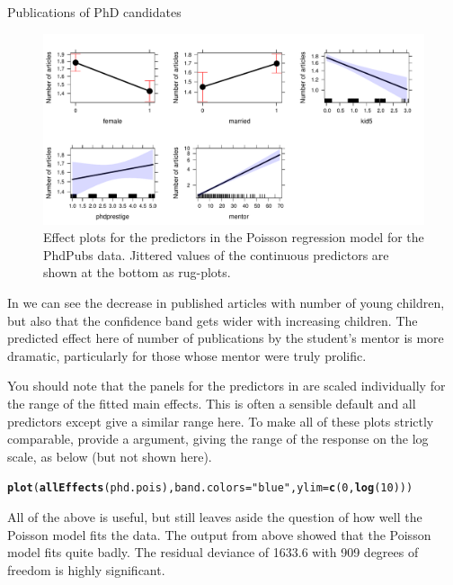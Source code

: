 \documentclass[11pt]{book}\usepackage[]{graphicx}\usepackage[]{color}
\makeatletter
\newcommand{\hlnum}[1]{\textcolor[rgb]{0.686,0.059,0.569}{#1}}%
\newcommand{\hlstr}[1]{\textcolor[rgb]{0.192,0.494,0.8}{#1}}%
\newcommand{\hlstd}[1]{\textcolor[rgb]{0.345,0.345,0.345}{#1}}%
\newcommand{\hlkwc}[1]{\textcolor[rgb]{0.333,0.667,0.333}{#1}}%
\newcommand{\hlkwd}[1]{\textcolor[rgb]{0.737,0.353,0.396}{\textbf{#1}}}%
\newenvironment{kframe}{%
 \def\at@end@of@kframe{}%
 \ifinner\ifhmode%
  \def\at@end@of@kframe{\end{minipage}}%
  \begin{minipage}{\columnwidth}%
 \fi\fi%
 \def\FrameCommand##1{\hskip\@totalleftmargin \hskip-\fboxsep
 \colorbox{shadecolor}{##1}\hskip-\fboxsep
     \hskip-\linewidth \hskip-\@totalleftmargin \hskip\columnwidth}%
 \MakeFramed {\advance\hsize-\width
   \@totalleftmargin\z@ \linewidth\hsize
   \@setminipage}}%
 {\par\unskip\endMakeFramed%
 \at@end@of@kframe}
\newenvironment{knitrout}{}{} %
\renewenvironment{knitrout}{\small\renewcommand{\baselinestretch}{.85}}{} %
\makeatother
\begin{document}
\begin{Example}[phdpubs1]{Publications of PhD candidates}
\begin{knitrout}
\begin{figure}[!htbp]
\centerline{\includegraphics[width=\textwidth]{ch09/fig/phdpubs1-effpois} }

\caption[Effect plots for the predictors in the Poisson regression model for the PhdPubs data]{Effect plots for the predictors in the Poisson regression model for the PhdPubs data. Jittered values of the continuous predictors are shown at the bottom as rug-plots.\label{fig:phdpubs1-effpois}}
\end{figure}


\end{knitrout}

In  we can see the decrease in published articles with
number of young children, but also that the confidence band gets wider with increasing
children.  The predicted effect here of number of publications by the student's mentor is more
dramatic, particularly for those whose mentor were truly prolific.

You should note that the panels for the predictors in  are scaled
individually for the range of the fitted main effects.  This is often a sensible default
and all predictors except  give a similar range here.  To make all of these
plots strictly comparable, provide a  argument, giving the range of the
response on the log scale, as below (but not shown here).
\begin{knitrout}
\color{fgcolor}\begin{kframe}
\begin{alltt}
\hlkwd{plot}\hlstd{(}\hlkwd{allEffects}\hlstd{(phd.pois),} \hlkwc{band.colors}\hlstd{=}\hlstr{"blue"}\hlstd{,} \hlkwc{ylim}\hlstd{=}\hlkwd{c}\hlstd{(}\hlnum{0}\hlstd{,}\hlkwd{log}\hlstd{(}\hlnum{10}\hlstd{)))}
\end{alltt}
\end{kframe}
\end{knitrout}

All of the above is useful, but still leaves aside the question of how well the Poisson model fits
the data. The output from  above showed that the Poisson model fits quite badly.
The residual deviance of 1633.6 with 909 degrees
of freedom is highly significant.

\end{Example}
\end{document}
